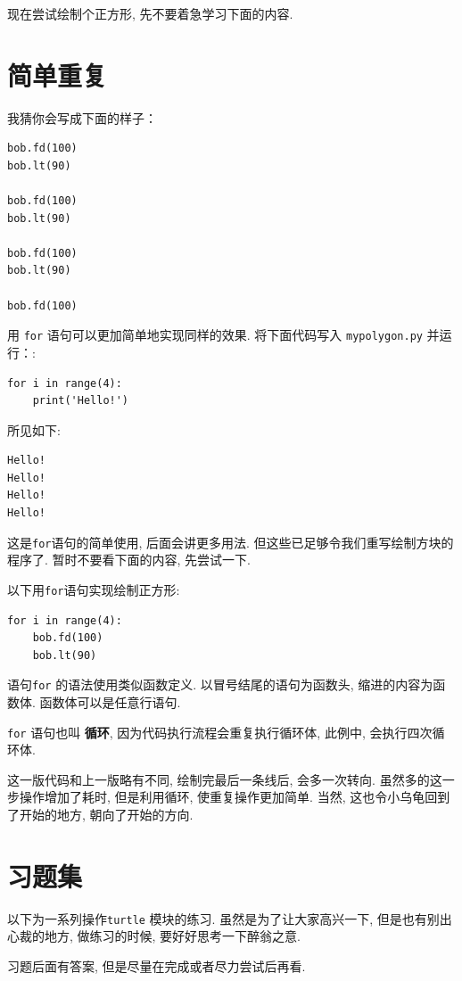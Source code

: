 \documentclass[10pt]{book}
\begin{document}
现在尝试绘制个正方形, 先不要着急学习下面的内容. 


\section{简单重复}
\label{repetition}

我猜你会写成下面的样子：

\begin{verbatim}
bob.fd(100)
bob.lt(90)

bob.fd(100)
bob.lt(90)

bob.fd(100)
bob.lt(90)

bob.fd(100)
\end{verbatim}
%
用 {\tt for} 语句可以更加简单地实现同样的效果. 
将下面代码写入 {\tt mypolygon.py} 并运行：:

\begin{verbatim}
for i in range(4):
    print('Hello!')
\end{verbatim}
%
所见如下:

\begin{verbatim}
Hello!
Hello!
Hello!
Hello!
\end{verbatim}
%
这是{\tt for}语句的简单使用, 后面会讲更多用法. 
但这些已足够令我们重写绘制方块的程序了. 
暂时不要看下面的内容, 先尝试一下. 

以下用{\tt for}语句实现绘制正方形:

\begin{verbatim}
for i in range(4):
    bob.fd(100)
    bob.lt(90)
\end{verbatim}
%
语句{\tt for} 的语法使用类似函数定义. 
以冒号结尾的语句为函数头, 
缩进的内容为函数体. 
函数体可以是任意行语句. 

 {\tt for} 语句也叫 {\bf 循环}, 因为代码执行流程会重复执行循环体, 
此例中, 会执行四次循环体.

这一版代码和上一版略有不同, 绘制完最后一条线后, 会多一次转向. 
虽然多的这一步操作增加了耗时, 但是利用循环, 使重复操作更加简单. 
当然, 这也令小乌龟回到了开始的地方, 朝向了开始的方向. 

\section{习题集}
以下为一系列操作{\tt turtle} 模块的练习. 
虽然是为了让大家高兴一下, 但是也有别出心裁的地方, 
做练习的时候, 要好好思考一下醉翁之意. 

习题后面有答案, 但是尽量在完成或者尽力尝试后再看. 
\end{document}
